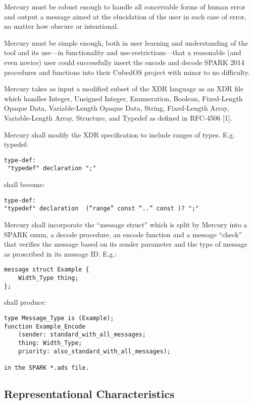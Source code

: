 Mercury must be robust enough to handle all conceivable forms of human error and output a
message aimed at the elucidation of the user in each case of error, no matter how obscure or
intentional.

Mercury must be simple enough, both in user learning and understanding of the tool and its
use—in functionality and use-restrictions—that a reasonable (and even novice) user could
successfully insert the encode and decode SPARK 2014 procedures and functions into their CubedOS
project with minor to no difficulty.

Mercury takes as input a modified subset of the XDR language as an XDR file which handles
Integer, Unsigned Integer, Enumeration, Boolean, Fixed-Length Opaque Data, Variable-Length
Opaque Data, String, Fixed-Length Array, Variable-Length Array, Structure, and Typedef as
defined in RFC-4506 [1].

Mercury shall modify the XDR specification to include ranges of types. E.g. typedef:

\begin{verbatim}
type-def:          
 "typedef" declaration ";"
\end{verbatim} 

shall become:

\begin{verbatim}
type-def:
"typedef" declaration  (“range” const “..” const )? ";"         
\end{verbatim}

Mercury shall incorporate the ``message struct'' which is split by Mercury into a SPARK enum, a
decode procedure, an encode function and a message “check” that verifies the message based on
its sender parameter and the type of message as proscribed in its message ID. E.g.:

\begin{verbatim}
message struct Example {
	Width_Type thing;
};
\end{verbatim}

shall produce:

\begin{verbatim}
type Message_Type is (Example);
function Example_Encode 
	(sender: standard_with_all_messages; 
	thing: Width_Type; 
	priority: also_standard_with_all_messages);

in the SPARK *.ads file.
\end{verbatim}

\subsection{Representational Characteristics}

